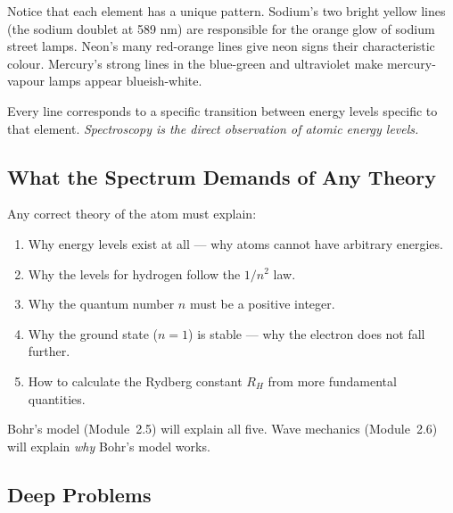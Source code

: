 \documentclass[12pt, a4paper]{book}
\begin{document}
\vspace{0.5em}

Notice that each element has a unique pattern.
Sodium's two bright yellow lines (the sodium doublet at 589 nm)
are responsible for the orange glow of sodium street lamps.
Neon's many red-orange lines give neon signs their characteristic
colour.
Mercury's strong lines in the blue-green and ultraviolet
make mercury-vapour lamps appear blueish-white.

Every line corresponds to a specific transition between
energy levels specific to that element.
\emph{Spectroscopy is the direct observation of atomic
energy levels.}

\subsection{What the Spectrum Demands of Any Theory}

Any correct theory of the atom must explain:

\begin{enumerate}[leftmargin=2em]
  \item Why energy levels exist at all --- why atoms cannot have
        arbitrary energies.
  \item Why the levels for hydrogen follow the $1/n^2$ law.
  \item Why the quantum number $n$ must be a positive integer.
  \item Why the ground state ($n=1$) is stable ---
        why the electron does not fall further.
  \item How to calculate the Rydberg constant $R_H$ from
        more fundamental quantities.
\end{enumerate}

Bohr's model (Module~2.5) will explain all five.
Wave mechanics (Module~2.6) will explain \emph{why}
Bohr's model works.

\subsection*{Deep Problems}
\end{document}
